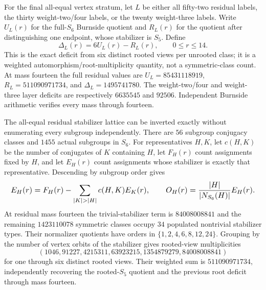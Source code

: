 \documentclass{article}
\newcommand{\fitmath}[1]{\resizebox{0.99\linewidth}{!}{$\displaystyle #1$}}
\begin{document}
For the final all-equal vertex stratum, let $L$ be either all fifty-two
residual labels, the thirty weight-two/four labels, or the twenty weight-three
labels. Write $U_L(r)$ for the full-$S_6$ Burnside quotient and $R_L(r)$ for the
quotient after distinguishing one endpoint, whose stabilizer is $S_5$. Define
\begin{equation}
  \Delta_L(r)=6U_L(r)-R_L(r),\qquad 0\leq r\leq14.
  \label{eq:optimization-crazy-sextuple-s6-full-rooted-decomposition}
\end{equation}
This is the exact deficit from six distinct rooted views per unrooted class; it
is a weighted automorphism/root-multiplicity quantity, not a symmetric-class
count. At mass fourteen the full residual values are
$U_L=85431118919$, $R_L=511090971734$, and $\Delta_L=1495741780$.
The weight-two/four and weight-three layer deficits are respectively $6635545$
and $92506$. Independent Burnside arithmetic verifies every mass through
fourteen.

The all-equal residual stabilizer lattice can be inverted exactly without
enumerating every subgroup independently. There are $56$ subgroup conjugacy
classes and $1455$ actual subgroups in $S_6$. For representatives $H,K$, let
$c(H,K)$ be the number of conjugates of $K$ containing $H$, let $F_H(r)$ count
assignments fixed by $H$, and let $E_H(r)$ count assignments whose stabilizer is
exactly that representative. Descending by subgroup order gives
\begin{equation}
  \fitmath{%
    E_H(r)=F_H(r)-\sum_{|K|>|H|}c(H,K)E_K(r),\qquad
    O_H(r)=\frac{|H|}{|N_{S_6}(H)|}E_H(r).
  }
  \label{eq:optimization-crazy-sextuple-s6-full-stabilizer-spectrum}
\end{equation}
At residual mass fourteen the trivial-stabilizer term is $84008008841$ and the
remaining $1423110078$ symmetric classes occupy $34$ populated nontrivial
stabilizer types. Their normalizer quotients have orders in
$\{1,2,4,6,8,12,24\}$. Grouping by the number of vertex orbits of the
stabilizer gives rooted-view multiplicities
\[
  (1046,91227,4215311,63923215,1354879279,84008008841)
\]
for one through six distinct rooted views. Their weighted sum is
$511090971734$, independently recovering the rooted-$S_5$ quotient and the
previous root deficit through mass fourteen.
\end{document}
